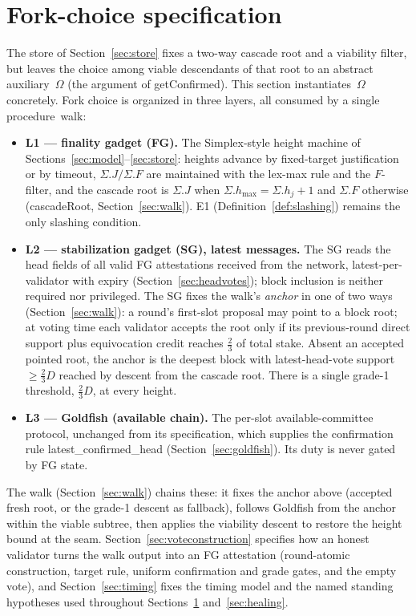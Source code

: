 \ifx\litemode\undefined\documentclass{article}\fi
\newcommand{\hmax}{\ensuremath{h_{\max}}\xspace}
\newcommand{\getConfirmed}{\textsf{getConfirmed}\xspace}
\newcommand{\Dvote}{\ensuremath{D}}         %
\newcommand{\cascadeRoot}{\textsf{cascadeRoot}\xspace}
\newcommand{\walk}{\textsf{walk}\xspace}
\newcommand{\latestConfirmed}{\textsf{latest\_confirmed\_head}\xspace}
\theoremstyle{plain}
\theoremstyle{definition}
\theoremstyle{remark}
\begin{document}
\section{Fork-choice specification}\label{sec:forkchoice}

The store of Section~\ref{sec:store} fixes a two-way cascade root and a
viability filter, but leaves the choice among viable descendants of that
root to an abstract auxiliary~$\Omega$ (the argument of \getConfirmed).
This section instantiates~$\Omega$ concretely.  Fork choice is organized
in three layers, all consumed by a single procedure~\walk:
\begin{itemize}
  \item \textbf{L1 --- finality gadget (FG).}  The Simplex-style height
    machine of Sections~\ref{sec:model}--\ref{sec:store}: heights advance
    by fixed-target justification or by timeout, $\Sigma.J/\Sigma.F$ are
    maintained with the lex-max rule and the $F$-filter, and the cascade
    root is $\Sigma.J$ when $\Sigma.\hmax = \Sigma.h_j + 1$ and $\Sigma.F$
    otherwise (\cascadeRoot, Section~\ref{sec:walk}).  E1
    (Definition~\ref{def:slashing}) remains the only slashing condition.
  \item \textbf{L2 --- stabilization gadget (SG), latest messages.}  The
    SG reads the head fields of all valid FG attestations received from the
    network, latest-per-validator with expiry (Section~\ref{sec:headvotes});
    block inclusion is neither required nor privileged.  The SG fixes the
    walk's \emph{anchor} in one of two
    ways (Section~\ref{sec:walk}): a round's first-slot proposal may
    point to a block root; at voting time each validator accepts the root
    only if its previous-round direct support plus equivocation credit reaches
    \(\tfrac23\) of total stake.  Absent an accepted pointed root, the anchor is the deepest block
    with latest-head-vote support $\geq \tfrac23\Dvote$ reached by descent
    from the cascade root.  There is a single grade-1 threshold,
    $\tfrac23\Dvote$, at
    every height.
  \item \textbf{L3 --- Goldfish (available chain).}  The per-slot
    available-committee protocol, unchanged from its specification, which
    supplies the confirmation rule \latestConfirmed
    (Section~\ref{sec:goldfish}).  Its duty is never gated by FG state.
\end{itemize}
The walk (Section~\ref{sec:walk}) chains these: it fixes the anchor above
(accepted fresh root, or the grade-1 descent as fallback), follows Goldfish
from the anchor within the viable subtree, then applies the viability
descent to restore the height bound at the seam.
Section~\ref{sec:voteconstruction} specifies how an honest validator turns
the walk output into an FG attestation (round-atomic construction, target
rule, uniform confirmation and grade gates, and the empty vote), and
Section~\ref{sec:timing} fixes the timing model and the named standing
hypotheses used throughout Sections~\ref{sec:forkchoice}
and~\ref{sec:healing}.
\end{document}
